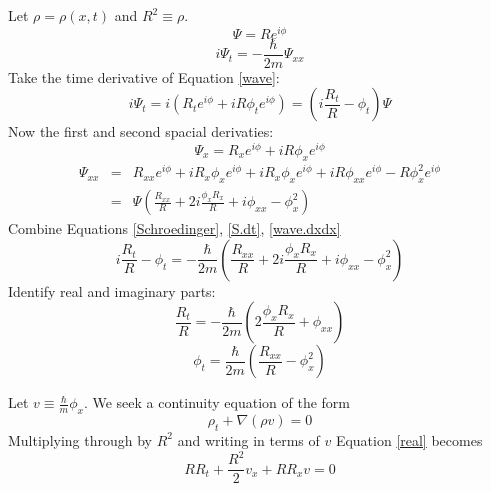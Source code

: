 \documentclass{article}
\begin{document}
Let $\rho = \rho(x,t)$ and $R^2 \equiv \rho$.
%
\begin{equation}
\label{wave}
\Psi = R e^{i\phi}
\end{equation}
%
\begin{equation}
\label{Schroedinger}
i\Psi_t = -\frac{\hbar}{2m}\Psi_{xx}
\end{equation}
%
Take the time derivative of Equation \ref{wave}:
%
\begin{equation}
\label{S.dt}
i\Psi_t = i\left(R_t e^{i\phi} + iR\phi_t e^{i\phi}\right)
        = \left(i\frac{R_t}{R} - \phi_t\right)\Psi
\end{equation}
%
Now the first and second spacial derivaties:
%
\begin{equation}
\Psi_x = R_x e^{i\phi} + iR\phi_x e^{i\phi}
\end{equation}
%
\begin{equation}
\label{wave.dxdx}
\begin{array}{rcl}
\Psi_{xx} &=& R_{xx} e^{i\phi} + iR_x\phi_x e^{i\phi}
          + iR_x\phi_x e^{i\phi} + iR\phi_{xx} e^{i\phi}
          - R\phi_x^2 e^{i\phi} \\
          &=& \Psi\left(\frac{R_{xx}}{R} + 2i\frac{\phi_xR_x}{R} + i\phi_{xx} - \phi_x^2\right)
\end{array}
\end{equation}
%
Combine Equations \ref{Schroedinger}, \ref{S.dt}, \ref{wave.dxdx}
%
\begin{equation}
i\frac{R_t}{R} - \phi_t = -\frac{\hbar}{2m}\left(\frac{R_{xx}}{R} + 2i\frac{\phi_xR_x}{R} + i\phi_{xx} - \phi_x^2\right)
\end{equation}
%
Identify real and imaginary parts:
%
\begin{equation}
\label{real}
\frac{R_t}{R} = -\frac{\hbar}{2m}\left(2\frac{\phi_xR_x}{R} + \phi_{xx}\right)
\end{equation}
%
\begin{equation}
\label{imag}
\phi_t = \frac{\hbar}{2m}\left(\frac{R_{xx}}{R} - \phi_x^2\right)
\end{equation}
 
Let $v \equiv \frac{\hbar}{m}\phi_x$. We seek a continuity equation of the form
%
\begin{equation}
\rho_t + \nabla (\rho v) = 0
\end{equation}
%
Multiplying through by $R^2$ and writing in terms of $v$ Equation \ref{real} becomes
\begin{equation}
R R_t + \frac{R^2}{2}v_x + R R_x v = 0
\end{equation}
\end{document}
